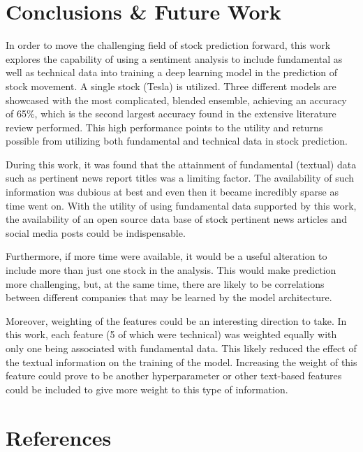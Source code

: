 \documentclass{article}
\begin{document}
\section{Conclusions \& Future Work}

In order to move the challenging field of stock prediction forward, this work
explores the capability of using a sentiment analysis to include fundamental as
well as technical data into training a deep learning model in the prediction of
stock movement. A single stock (Tesla) is utilized. Three
different models are showcased with the most complicated, blended ensemble,
achieving an accuracy of 65\%, which is the second largest accuracy found in the
extensive literature review performed. 
This high performance points to the utility and returns
possible from utilizing both fundamental and technical data in stock prediction.

During this work, it was found that the attainment of fundamental
(textual) data such as pertinent news report titles was a limiting factor. The
availability of such information was dubious at best and even then it became
incredibly sparse as time went on. With the utility of using fundamental data
supported by this work, the availability of an open source data base of stock
pertinent news articles and social media posts could be indispensable.

Furthermore, if more time were available, it would be a useful alteration to
include more than just one stock in the analysis. This would make prediction
more challenging, but, at the same time, there are likely to be correlations
between different companies that may be learned by the model architecture.

Moreover, weighting of the features could be an interesting direction to take.
In this work, each feature (5 of which were technical) was weighted equally with
only one being associated with fundamental data. This likely reduced the effect
of the textual information on the training of the model. Increasing the weight
of this feature could prove to be another hyperparameter or other text-based
features could be included to give more weight to this type of information.

\section{References}
\end{document}
